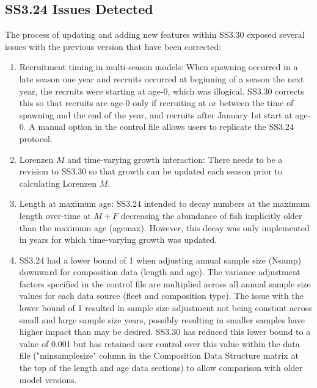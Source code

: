\subsection{SS3.24 Issues Detected}
The process of updating and adding new features within SS3.30 exposed several issues with the previous version that have been corrected:
\begin{enumerate}
	\item Recruitment timing in multi-season models: When spawning occurred in a late season one year and recruits occurred at beginning of a season the next year, the recruits were starting at age-0, which was illogical.  SS3.30 corrects this so that recruits are age-0 only if recruiting at or between the time of spawning and the end of the year, and recruits after January 1st start at age-0.  A manual option in the control file allows users to replicate the SS3.24 protocol.
	
	\item Lorenzen $M$ and time-varying growth interaction: There needs to be a revision to SS3.30 so that growth can be updated each season prior to calculating Lorenzen $M$.
	
	\item Length at maximum age: SS3.24 intended to decay numbers at the maximum length over-time at $M + F$ decreasing the abundance of fish implicitly older than the maximum age (agemax).  However, this decay was only implemented in years for which time-varying growth was updated. 
	 
	\item SS3.24 had a lower bound of 1 when adjusting annual sample size (Nsamp) downward for composition data (length and age).  The variance adjustment factors specified in the control file are multiplied across all annual sample size values for each data source (fleet and composition type).  The issue with the lower bound of 1 resulted in sample size adjustment not being constant across small and large sample size years, possibly resulting in smaller samples have higher impact than may be desired.  SS3.30 has reduced this lower bound to a value of 0.001 but has retained user control over this value within the data file ("minsamplesize" column in the Composition Data Structure matrix at the top of the length and age data sections) to allow comparison with older model versions. 
\end{enumerate}